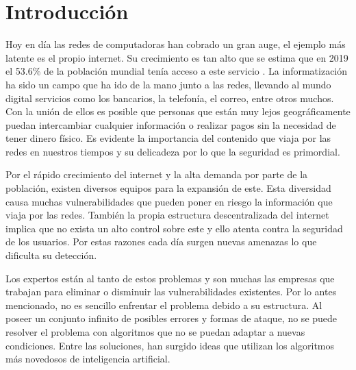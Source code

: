\chapter*{Introducción}\label{chapter:introduction}




Hoy en día las redes de computadoras han cobrado un gran auge, el ejemplo más latente es el propio internet. Su crecimiento es tan alto que se estima que en 2019 el 53.6\% de la población mundial tenía acceso a este servicio \cite{acceso a internet}. La informatización ha sido un campo que ha ido de la mano junto a las redes, llevando al mundo digital servicios como los bancarios, la telefonía, el correo, entre otros muchos. Con la unión de ellos es posible que personas que están muy lejos geográficamente puedan intercambiar cualquier información o realizar pagos sin la necesidad de tener dinero físico. Es evidente la importancia del contenido que viaja por las redes en nuestros tiempos y su delicadeza por lo que la seguridad es primordial.

Por el rápido crecimiento del internet y la alta demanda por parte de la población, existen diversos equipos para la expansión de este. Esta diversidad causa muchas vulnerabilidades que pueden poner en riesgo la información que viaja por las redes. También la propia estructura descentralizada del internet implica que no exista un alto control sobre este y ello atenta contra la seguridad de los usuarios. Por estas razones cada día surgen nuevas amenazas lo que dificulta su detección.

Los expertos están al tanto de estos problemas y son muchas las empresas que trabajan para eliminar o disminuir las vulnerabilidades existentes. Por lo antes mencionado, no es sencillo enfrentar el problema debido a su estructura. Al poseer un conjunto infinito de posibles errores y formas de ataque, no se puede resolver el problema con algoritmos que no se puedan adaptar a nuevas condiciones. Entre las soluciones, han surgido ideas que utilizan los algoritmos más novedosos de inteligencia artificial.

